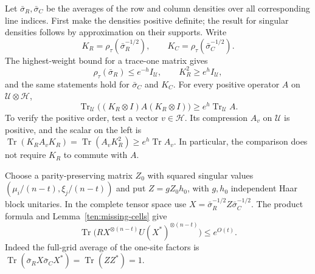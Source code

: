 Let $\bar\sigma_R,\bar\sigma_C$ be the averages of the row and column densities over all corresponding line indices. First make the densities positive definite; the result for singular densities follows by approximation on their supports. Write
\[
 K_R=\rho_\tau(\bar\sigma_R^{-1/2}),\qquad
 K_C=\rho_\tau(\bar\sigma_C^{-1/2}).
\]
The highest-weight bound for a trace-one matrix gives
\[
 \rho_\tau(\bar\sigma_R)\le e^{-h}I_{\mathcal U},
 \qquad K_R^2\ge e^h I_{\mathcal U},
\]
and the same statements hold for $\bar\sigma_C$ and $K_C$. For every positive operator $A$ on $\mathcal U\otimes\mathcal H$,
\begin{equation}
\label{ten:compressed:partialtrace-positive}
 \operatorname{Tr}_{\mathcal U}
  \big((K_R\otimes I)A(K_R\otimes I)\big)
 \ge e^h\operatorname{Tr}_{\mathcal U}A.
\end{equation}
To verify the positive order, test a vector $v\in\mathcal H$. Its compression $A_v$ on $\mathcal U$ is positive, and the scalar on the left is
$\operatorname{Tr}(K_R A_vK_R)
 =\operatorname{Tr}(A_vK_R^2)
 \ge e^h\operatorname{Tr}A_v$.
In particular, the comparison does not require $K_R$ to commute with $A$.

Choose a parity-preserving matrix $Z_0$ with squared singular values
$(\mu_i/(n-t),\xi_j/(n-t))$ and put $Z=gZ_0h_0$, with $g,h_0$ independent Haar block unitaries. In the complete tensor space use
$X=\bar\sigma_R^{-1/2}Z\bar\sigma_C^{-1/2}$.
The product formula and Lemma~\ref{ten:missing-cells} give
\begin{equation}
\label{ten:compressed:covariance-upper}
 \operatorname{Tr}\big(RX^{\otimes(n-t)}
                U(X^*)^{\otimes(n-t)}\big)\le e^{O(t)}.
\end{equation}
Indeed the full-grid average of the one-site factors is
$\operatorname{Tr}(\bar\sigma_R X\bar\sigma_C X^*)=
 \operatorname{Tr}(ZZ^*)=1$.

